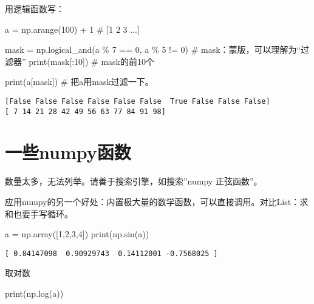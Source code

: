\documentclass[
  letterpaper,
  DIV=11,
  numbers=noendperiod]{scrreprt}
\newenvironment{Shaded}{\begin{snugshade}}{\end{snugshade}}
\newcommand{\BuiltInTok}[1]{\textcolor[rgb]{0.00,0.23,0.31}{#1}}
\newcommand{\CommentTok}[1]{\textcolor[rgb]{0.37,0.37,0.37}{#1}}
\newcommand{\DecValTok}[1]{\textcolor[rgb]{0.68,0.00,0.00}{#1}}
\newcommand{\NormalTok}[1]{\textcolor[rgb]{0.00,0.23,0.31}{#1}}
\newcommand{\OperatorTok}[1]{\textcolor[rgb]{0.37,0.37,0.37}{#1}}
\begin{document}
用逻辑函数写：

\begin{Shaded}
\begin{Highlighting}[]
\NormalTok{a }\OperatorTok{=}\NormalTok{ np.arange(}\DecValTok{100}\NormalTok{) }\OperatorTok{+} \DecValTok{1} \CommentTok{\# [1 2 3 ...]}

\NormalTok{mask }\OperatorTok{=}\NormalTok{ np.logical\_and(a }\OperatorTok{\%} \DecValTok{7} \OperatorTok{==} \DecValTok{0}\NormalTok{, a }\OperatorTok{\%} \DecValTok{5} \OperatorTok{!=} \DecValTok{0}\NormalTok{)  }\CommentTok{\# mask：蒙版，可以理解为“过滤器”}
\BuiltInTok{print}\NormalTok{(mask[:}\DecValTok{10}\NormalTok{]) }\CommentTok{\# mask的前10个}

\BuiltInTok{print}\NormalTok{(a[mask]) }\CommentTok{\# 把a用mask过滤一下。}
\end{Highlighting}
\end{Shaded}

\begin{verbatim}
[False False False False False False  True False False False]
[ 7 14 21 28 42 49 56 63 77 84 91 98]
\end{verbatim}

\hypertarget{ux4e00ux4e9bnumpyux51fdux6570}{%
\section{一些numpy函数}\label{ux4e00ux4e9bnumpyux51fdux6570}}

数量太多，无法列举。请善于搜索引擎，如搜索''numpy 正弦函数''。

应用numpy的另一个好处：内置极大量的数学函数，可以直接调用。对比List：求和也要手写循环。

\begin{Shaded}
\begin{Highlighting}[]
\NormalTok{a }\OperatorTok{=}\NormalTok{ np.array([}\DecValTok{1}\NormalTok{,}\DecValTok{2}\NormalTok{,}\DecValTok{3}\NormalTok{,}\DecValTok{4}\NormalTok{])}
\BuiltInTok{print}\NormalTok{(np.sin(a))}
\end{Highlighting}
\end{Shaded}

\begin{verbatim}
[ 0.84147098  0.90929743  0.14112001 -0.7568025 ]
\end{verbatim}

取对数

\begin{Shaded}
\begin{Highlighting}[]
\BuiltInTok{print}\NormalTok{(np.log(a))}
\end{Highlighting}
\end{Shaded}
\end{document}
